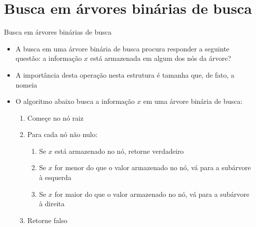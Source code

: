 \section{Busca em árvores binárias de busca}

\begin{frame}{Busca em árvores binárias de busca}

	\begin{itemize}

        \item A busca em uma árvore binária de busca procura responder a seguinte questão:
            a informação $x$ está armazenada em algum dos nós da árvore?

        \item A importância desta operação nesta estrutura é tamanha que, de fato, a nomeia

        \item O algoritmo abaixo busca a informação $x$ em uma árvore binária de busca:

        \begin{enumerate}
            \item Começe no nó {raiz}

            \item Para cada nó {não nulo}:

            \begin{enumerate}
                \item Se $x$ {está} armazenado no nó, {retorne verdadeiro}

                \item Se $x$ for {menor} do que o valor 
                armazenado no nó, vá para a subárvore à {esquerda}

                \item Se $x$ for {maior} do que o valor 
                armazenado no nó, vá para a subárvore à {direita}
            \end{enumerate}

            \item Retorne falso
        \end{enumerate}

	\end{itemize}

\end{frame}

